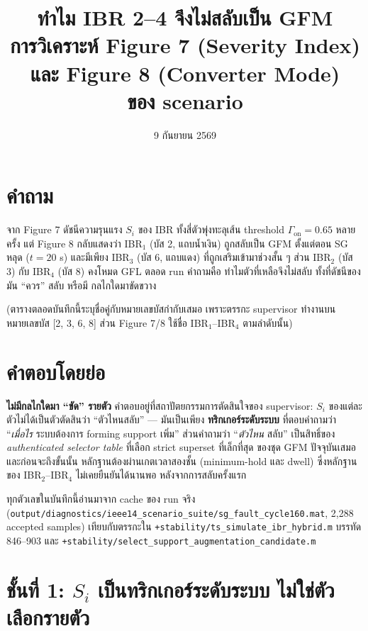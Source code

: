 \documentclass[11pt,a4paper]{article}
\title{\bfseries\color{myblue} ทำไม IBR 2--4 จึงไม่สลับเป็น GFM\\[2pt]
\large การวิเคราะห์ Figure 7 (Severity Index) และ Figure 8 (Converter Mode)\\
ของ scenario \code{sg\_fault\_cycle160}}
\author{}
\date{9 กันยายน 2569}
\newcommand{\code}[1]{\texttt{\small #1}}
\begin{document}
\maketitle
\vspace{-1.2em}

\section*{คำถาม}
จาก Figure 7 ดัชนีความรุนแรง $S_i$ ของ IBR ทั้งสี่ตัวพุ่งทะลุเส้น threshold
$\Gamma_{\mathrm{on}} = 0.65$ หลายครั้ง แต่ Figure 8 กลับแสดงว่า IBR$_1$
(บัส 2, แถบน้ำเงิน) ถูกสลับเป็น GFM ตั้งแต่ตอน SG หลุด ($t = 20$ s) และมีเพียง
IBR$_3$ (บัส 6, แถบแดง) ที่ถูกเสริมเข้ามาช่วงสั้น ๆ ส่วน IBR$_2$ (บัส 3) กับ
IBR$_4$ (บัส 8) คงโหมด GFL ตลอด run คำถามคือ ทำไมตัวที่เหลือจึงไม่สลับ ทั้งที่ดัชนีของมัน ``ควร'' สลับ หรือมี
กลไกใดมาขัดขวาง

(ตารางตลอดบันทึกนี้ระบุชื่อคู่กับหมายเลขบัสกำกับเสมอ เพราะตรรกะ supervisor
ทำงานบนหมายเลขบัส [2, 3, 6, 8] ส่วน Figure 7/8 ใช้ชื่อ IBR$_1$--IBR$_4$
ตามลำดับนั้น)

\section*{คำตอบโดยย่อ}
\textbf{ไม่มีกลไกใดมา ``ขัด'' รายตัว} คำตอบอยู่ที่สถาปัตยกรรมการตัดสินใจของ
supervisor: $S_i$ ของแต่ละตัวไม่ได้เป็นตัวตัดสินว่า ``ตัวไหนสลับ'' — มันเป็นเพียง
\textbf{ทริกเกอร์ระดับระบบ} ที่ตอบคำถามว่า ``\emph{เมื่อไร} ระบบต้องการ
forming support เพิ่ม'' ส่วนคำถามว่า ``\emph{ตัวไหน} สลับ'' เป็นสิทธิ์ของ
\emph{authenticated selector table} ที่เลือก strict superset ที่เล็กที่สุด
ของชุด GFM ปัจจุบันเสมอ และก่อนจะถึงขั้นนั้น หลักฐานต้องผ่านเกตเวลาสองชั้น
(minimum-hold และ dwell) ซึ่งหลักฐานของ IBR$_2$--IBR$_4$ ไม่เคยยืนยันได้นานพอ
หลังจากการสลับครั้งแรก

ทุกตัวเลขในบันทึกนี้อ่านมาจาก cache ของ run จริง
(\code{output/diagnostics/ieee14\_scenario\_suite/sg\_fault\_cycle160.mat},
2{,}288 accepted samples) เทียบกับตรรกะใน
\code{+stability/ts\_simulate\_ibr\_hybrid.m} บรรทัด 846--903 และ
\code{+stability/select\_support\_augmentation\_candidate.m}

\section{ชั้นที่ 1: $S_i$ เป็นทริกเกอร์ระดับระบบ ไม่ใช่ตัวเลือกรายตัว}
\end{document}
